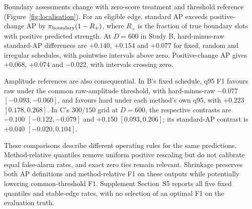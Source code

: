 Boundary assessments change with zero-score treatment and threshold reference
(Figure~\ref{fig:localisation}). For an eligible edge, standard AP exceeds
positive-change AP by $\pi_{\rm boundary}(1-R_+)$, where $R_+$ is the
fraction of true boundary slots with positive predicted strength.
At $D=600$ in Study B, hard-minus-raw standard-AP differences are
$+0.140$, $+0.154$ and $+0.077$ for fixed, random and irregular schedules,
with pointwise intervals above zero. Positive-change AP gives $+0.068$,
$+0.074$ and $-0.022$, with intervals crossing zero.

Amplitude references are also consequential. In B's fixed schedule, q95 F1
favours raw under the common raw-amplitude threshold, with hard-minus-raw
$-0.077$ $[-0.093,-0.060]$, and favours hard under each method's own
q95, with $+0.223$ $[0.178,0.268]$. In C's $300/150$ grid at $D=600$,
the respective contrasts are $-0.100$ $[-0.122,-0.079]$ and $+0.150$
$[0.093,0.206]$; its standard-AP contrast is $+0.040$ $[-0.020,0.104]$.

These comparisons describe different operating rules for the same predictions.
Method-relative quantiles remove uniform positive rescaling but do not
calibrate equal false-alarm rates, and exact zero ties remain relevant.
Shrinkage preserves both AP definitions and method-relative F1 on these
outputs while potentially lowering common-threshold F1. Supplement Section~S5
reports all five fixed quantiles and stable-edge rates, with no selection of
an optimal F1 on the evaluation truth.
